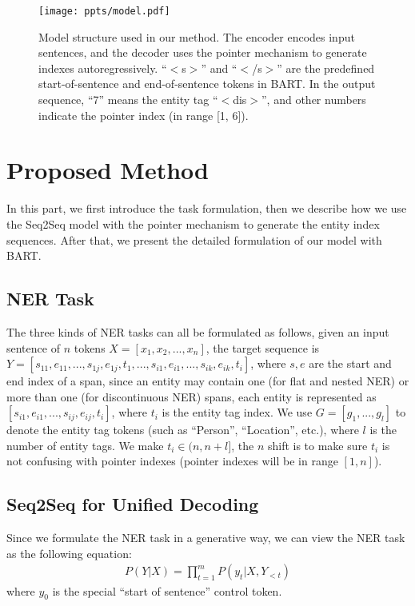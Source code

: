\documentclass[11pt,a4paper]{article}
\begin{document}
\begin{figure*}[t]
\centering
  \texttt{[image: ppts/model.pdf]}
  \caption{Model structure used in our method. The encoder encodes input sentences, and the decoder uses the pointer mechanism to generate indexes autoregressively. ``$<$s$>$'' and ``$<$/s$>$'' are the predefined start-of-sentence and end-of-sentence tokens in BART. In the output sequence, ``7'' means the entity tag ``$<$dis$>$'', and other numbers indicate the pointer index (in range [1, 6]).}\label{fig:strucutre}
\end{figure*}

\section{Proposed Method}
In this part, we first introduce the task formulation, then we describe how we use the Seq2Seq model with the pointer mechanism to generate the entity index sequences. After that, we present the detailed formulation of our model with BART.


\subsection{NER Task}
The three kinds of NER tasks can all be formulated as follows, given an input sentence of $n$ tokens $X=[x_1, x_2, ..., x_n]$,  the target sequence is $Y=[s_{11}, e_{11},...,s_{1j}, e_{1j}, t_1, ..., s_{i1}, e_{i1},...,s_{ik},e_{ik}, t_i]$, where $s,e$ are the start and end index of a span, since an entity may contain one (for flat and nested NER) or more than one (for discontinuous NER) spans, each entity is represented as $[s_{i1}, e_{i1},...,s_{ij}, e_{ij}, t_i]$, where $t_i$ is the entity tag index. We use $G=[g_1, ..., g_l]$ to denote the entity tag tokens (such as ``Person'', ``Location'', etc.), where $l$ is the number of entity tags.  We make $t_i \in (n, n+l]$, the $n$ shift is to make sure $t_i$ is not confusing with pointer indexes (pointer indexes will be in range $[1, n]$).


\subsection{Seq2Seq for Unified Decoding}
Since we formulate the NER task in a generative way, we can view the NER task as the following equation:
\begin{align}
  P(Y|X) = \prod_{t=1}^m P(y_t|X, Y_{<t})
\end{align}
where $y_0$ is the special ``start of sentence'' control token.
\end{document}
